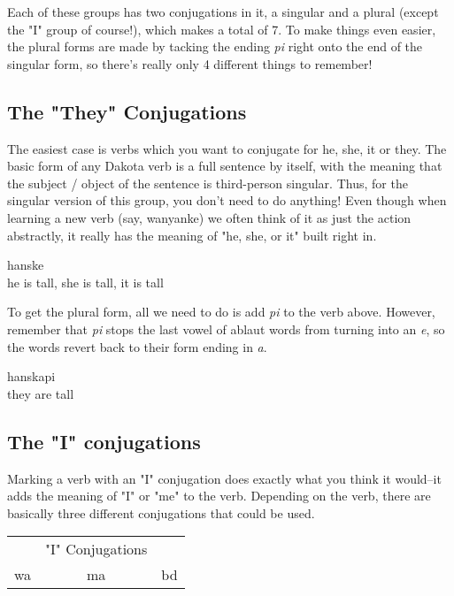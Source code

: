 \documentclass[10pt,a4paper]{article} %
\begin{document}
Each of these groups has two conjugations in it, a singular and a plural (except the "I" group of course!), which makes a total of 7.  To make things even easier, the plural forms are made by tacking the ending \emph{pi} right onto the end of the singular form, so there's really only 4 different things to remember!


\subsection{The "They" Conjugations}
The easiest case is verbs which you want to conjugate for he, she, it or they.  The basic form of any Dakota verb is a full sentence by itself, with the meaning that the subject / object of the sentence is third-person singular.  Thus, for the singular version of this group, you don't need to do anything!  Even though when learning a new verb (say, wanyanke) we often think of it as just the action abstractly, it really has the meaning of "he, she, or it" built right in.
\begin{center}
hanske\\
he is tall, 
she is tall,
it is tall
\end{center}

To get the plural form, all we need to do is add \emph{pi} to the verb above.  However, remember that \emph{pi} stops the last vowel of ablaut words from turning into an \emph{e}, so the words revert back to their form ending in \emph{a}.

\begin{center}
hanskapi\\
they are tall
\end{center}




\subsection{The "I" conjugations}
Marking a verb with an "I" conjugation does exactly what you think it would--it adds the meaning of "I" or "me" to the verb.  Depending on the verb, there are basically three different conjugations that could be used.

\begin{center}
\begin{tabular}{l c r }
 &"I" Conjugations & \\
 wa & ma & bd \\
\end{tabular}
\end{center}
\end{document}
